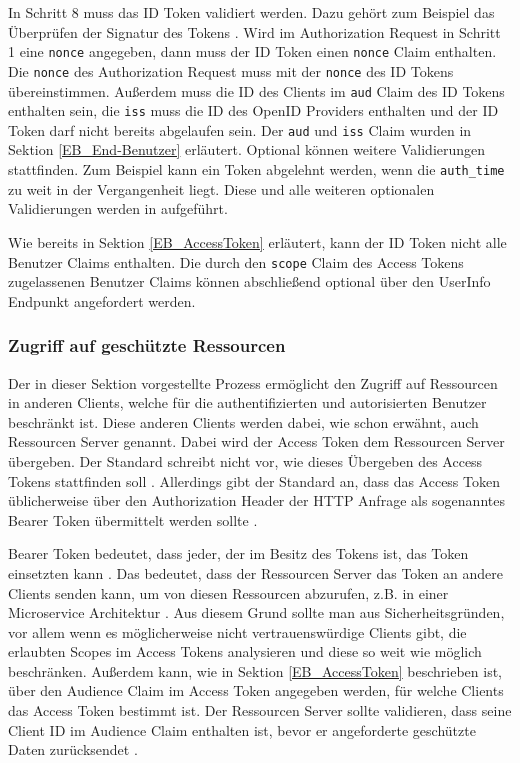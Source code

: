 In Schritt 8 muss das ID Token validiert werden. Dazu gehört zum Beispiel das Überprüfen der Signatur des Tokens \cite[ID Token Validation]{EB4}. Wird im Authorization Request in Schritt 1 eine \texttt{nonce} angegeben, dann muss der ID Token einen \texttt{nonce} Claim enthalten. Die \texttt{nonce} des Authorization Request muss mit der \texttt{nonce} des ID Tokens übereinstimmen. Außerdem muss die ID des Clients im \texttt{aud} Claim des ID Tokens enthalten sein, die \texttt{iss} muss die ID des OpenID Providers enthalten und der ID Token darf nicht bereits abgelaufen sein. Der \texttt{aud} und \texttt{iss} Claim wurden in Sektion \ref{EB_End-Benutzer} erläutert. Optional können weitere Validierungen stattfinden. Zum Beispiel kann ein Token abgelehnt werden, wenn die \texttt{auth\_time} zu weit in der Vergangenheit liegt. Diese und alle weiteren optionalen Validierungen werden in \cite[ID Token Validation]{EB4} aufgeführt.

Wie bereits in Sektion \ref{EB_AccessToken} erläutert, kann der ID Token nicht alle Benutzer Claims enthalten. Die durch den \texttt{scope} Claim des Access Tokens zugelassenen Benutzer Claims können abschließend optional über den UserInfo Endpunkt angefordert werden.


\subsubsection{Zugriff auf geschützte Ressourcen} \label{EB_Zugriff auf geschützte Ressourcen}

Der in dieser Sektion vorgestellte Prozess ermöglicht den Zugriff auf Ressourcen in anderen Clients, welche für die authentifizierten und autorisierten Benutzer beschränkt ist. Diese anderen Clients werden dabei, wie schon erwähnt, auch Ressourcen Server genannt. Dabei wird der Access Token dem Ressourcen Server übergeben. Der Standard schreibt nicht vor, wie dieses Übergeben des Access Tokens stattfinden soll \cite[Sec. 7]{SSEB_RFC6749}. Allerdings gibt der Standard an, dass das Access Token üblicherweise über den Authorization Header der HTTP Anfrage als sogenanntes Bearer Token übermittelt werden sollte \cite[Sec. 7]{SSEB_RFC6749}. 

Bearer Token bedeutet, dass jeder, der im Besitz des Tokens ist, das Token einsetzten kann \cite[Sec. 1.2]{SSEB_RFC6750}. Das bedeutet, dass der Ressourcen Server das Token an andere Clients senden kann, um von diesen Ressourcen abzurufen, z.B. in einer Microservice Architektur \cite{EB31}. Aus diesem Grund sollte man aus Sicherheitsgründen, vor allem wenn es möglicherweise nicht vertrauenswürdige Clients gibt, die erlaubten Scopes im Access Tokens analysieren und diese so weit wie möglich beschränken. Außerdem kann, wie in Sektion \ref{EB_AccessToken} beschrieben ist, über den Audience Claim im Access Token angegeben werden, für welche Clients das Access Token bestimmt ist. Der Ressourcen Server sollte validieren, dass seine Client ID im Audience Claim enthalten ist, bevor er angeforderte geschützte Daten zurücksendet \cite[Audience Support]{SSEB_keycloakDocs}.

